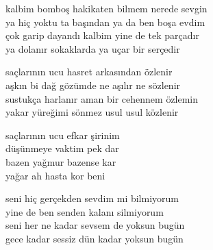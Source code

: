 \documentclass[10pt, openright, oneside]{memoir}
\theoremstyle{definition}
\begin{document}
\vspace*{\fill}
%
\newpage
{}
\vspace*{\fill}
\settowidth{\versewidth}{ya hiç yoktu ta başından ya da ben boşa evdim}
\begin{cverse}
  kalbim bomboş hakikaten bilmem nerede sevgin \\
  ya hiç yoktu ta başından ya da ben boşa evdim \\
  çok garip dayandı kalbim yine de tek parçadır \\
  ya dolanır sokaklarda ya uçar bir serçedir \\
\end{cverse}
\vspace*{\fill}
%
\newpage
{}
\vspace*{\fill}
\settowidth{\versewidth}{sustukça harlanır aman bir cehennem özlemin}
\begin{cverse}
  saçlarının ucu hasret arkasından özlenir \\
  aşkın bi dağ gözümde ne aşılır ne sözlenir \\
  sustukça harlanır aman bir cehennem özlemin \\
  yakar yüreğimi sönmez usul usul közlenir

  saçlarının ucu efkar şirinim \\
  düşünmeye vaktim pek dar \\
  bazen yağmur bazense kar \\
  yağar ah hasta kor beni \\
\end{cverse}
\vspace*{\fill}
%
\newpage
{}
\vspace*{\fill}
\settowidth{\versewidth}{seni her ne kadar sevsem de yoksun bugün}
\begin{cverse}
  seni hiç gerçekden sevdim mi bilmiyorum \\
  yine de ben senden kalanı silmiyorum \\
  seni her ne kadar sevsem de yoksun bugün \\
  gece kadar sessiz dün kadar yoksun bugün \\
\end{cverse}
\vspace*{\fill}
%
\newpage
{}
\vspace*{\fill}
\end{document}
